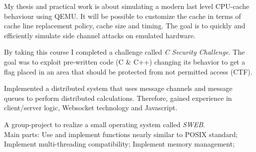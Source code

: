 \documentclass[]{resume}
\begin{document}
\begin{minipage}[t]{0.66\textwidth}
		My thesis and practical work is about simulating a modern last level CPU-cache behaviour using QEMU. It will be possible to customize the cache in terms of cache line replacement policy, cache size and timing. The goal is to quickly and efficiently simulate side channel attacks on emulated hardware. \sectionsep
	
		By taking this course I completed a challenge called \textit{C Security Challenge}. The goal was to exploit pre-written code (C \& C++) changing its behavior to get a flag placed in an area that should be protected from not permitted access (CTF). \sectionsep
		
		Implemented a distributed system that uses message channels and message queues to perform distributed calculations. Therefore, gained experience in client/server logic, Websocket technology and Javascript. \sectionsep
		
		A group-project to realize a small operating system called \textit{SWEB}. \\ 
		Main parts: Use and implement functions nearly similar to POSIX standard; Implement multi-threading compatibility; Implement memory management;\sectionsep 
		
\end{minipage} 
\vfill \vfill \vfill \vfill
\end{document}
